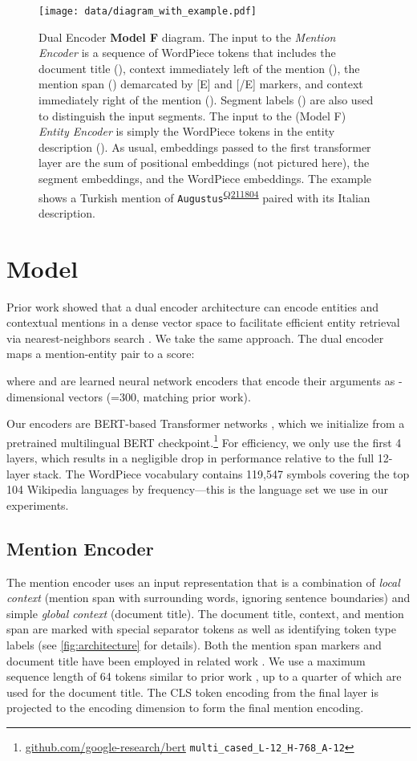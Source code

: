 \documentclass[11pt,a4paper]{article}
\newcommand{\entity}[1]{\texttt{#1}}
\newcommand{\ientity}[2]{\entity{#1}\textsuperscript{\href{https://www.wikidata.org/wiki/#2}{#2}}}
\begin{document}
\begin{figure*}
  \centering
  \texttt{[image: data/diagram\_with\_example.pdf]}
  \caption{
  \small Dual Encoder \textbf{Model F} diagram. The input to the \textit{Mention Encoder} is a sequence of WordPiece tokens that includes the document title (), context immediately left of the mention (), the mention span () demarcated by [E] and [/E] markers, and context immediately right of the mention (). Segment labels () are also used to distinguish the input segments. The input to the (Model F) \textit{Entity Encoder} is simply the WordPiece tokens in the entity description (). As usual, embeddings passed to the first transformer layer are the sum of positional embeddings (not pictured here), the segment embeddings, and the WordPiece embeddings. The example shows a Turkish mention of \ientity{Augustus}{Q211804} paired with its Italian description. \label{fig:architecture}} 
\end{figure*}

\section{Model}
Prior work showed that a dual encoder architecture can encode entities and contextual mentions in a dense vector space to facilitate efficient entity retrieval via nearest-neighbors search \citep{gillick-etal-2019-learning,wu2019zeroshot}.
We take the same approach.
The dual encoder maps a mention-entity pair  to a score:

where  and  are learned neural network encoders that encode their arguments as -dimensional vectors (=300, matching prior work).

Our encoders are BERT-based Transformer networks \cite{vaswani2017attention,devlin-etal-2019-bert}, which we initialize from a pretrained multilingual BERT checkpoint.\footnote{\url{github.com/google-research/bert} \texttt{multi\_cased\_L-12\_H-768\_A-12}}
For efficiency, we only use the first 4 layers, which results in a negligible drop in performance relative to the full 12-layer stack. 
The WordPiece vocabulary contains 119,547 symbols covering the top 104 Wikipedia languages by frequency---this is the language set we use in our experiments.

\subsection{Mention Encoder}
The mention encoder  uses an  input representation that is a combination of \emph{local context} (mention span with surrounding words, ignoring sentence boundaries) and simple \emph{global context} (document title). The document title, context, and mention span are marked with special separator tokens as well as identifying token type labels (see \autoref{fig:architecture} for details). Both the mention span markers and document title have been employed in related work \citep{agarwal2020entity,fevry2020empirical}.  We use a maximum sequence length of 64 tokens similar to prior work \citep{fevry2020empirical}, up to a quarter of which are used for the document title. The CLS token encoding from the final layer is projected to the encoding dimension to form the final mention encoding.
\end{document}

